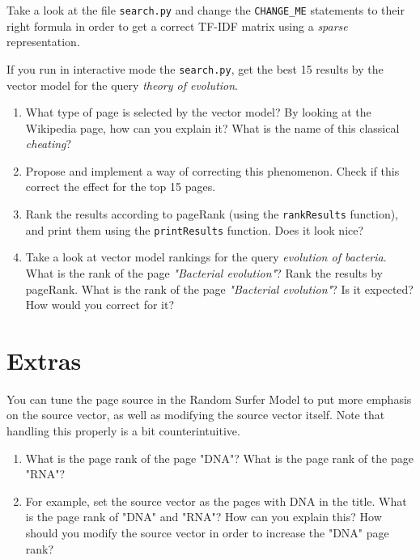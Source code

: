 \documentclass[mathserif, 11pt,c]{article}
\begin{document}
Take a look at the file \texttt{search.py} and change the \texttt{CHANGE\_ME} statements to their right formula in order to get a correct TF-IDF matrix using a \textit{sparse }representation.

If you run in interactive mode the \texttt{search.py}, get the best 15 results by the vector model for the query \textit{theory of evolution}.

\begin{enumerate}[label=\textbf{Q\thesection.\arabic*}]
	\item What type of page is selected by the vector model? By looking at the Wikipedia page, how can you explain it? What is the name of this classical \textit{cheating}?
	\item Propose and implement a way of correcting this phenomenon. Check if this correct the effect for the top 15 pages.
	\item Rank the results according to pageRank (using the \texttt{rankResults} function), and print them using the \texttt{printResults} function. Does it look nice?
	\item Take a look at vector model rankings for the query \textit{evolution of bacteria}. What is the rank of the page \textit{"Bacterial evolution"}? Rank the results by pageRank. What is the rank of the page \textit{"Bacterial evolution"}? Is it expected? How would you correct for it?
\end{enumerate}


\section{Extras}

You can tune the page source in the Random Surfer Model to put more emphasis on the source vector, as well as modifying the source vector itself.
Note that handling this properly is a bit counterintuitive.

\begin{enumerate}[label=\textbf{Q\thesection.\arabic*}]
	\item What is the page rank of the page "DNA"? What is the page rank of the page "RNA"?
	\item For example, set the source vector as the pages with DNA in the title. What is the page rank of "DNA" and "RNA"? How can you explain this? How should you modify the source vector in order to increase the "DNA" page rank?
\end{enumerate}
	

%
\end{document}
